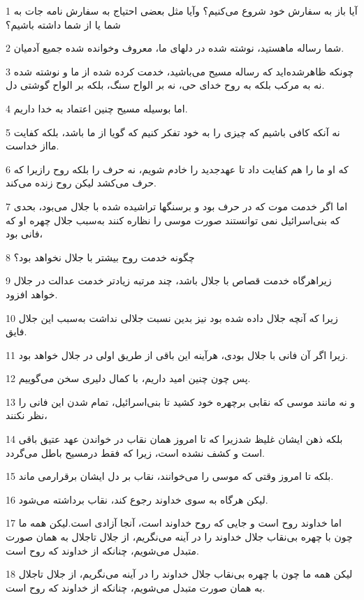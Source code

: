 \par 1 آیا باز به سفارش خود شروع می‌کنیم؟ وآیا مثل بعضی احتیاج به سفارش نامه جات به شما یا از شما داشته باشیم؟
\par 2 شما رساله ماهستید، نوشته شده در دلهای ما، معروف وخوانده شده جمیع آدمیان.
\par 3 چونکه ظاهرشده‌اید که رساله مسیح می‌باشید، خدمت کرده شده از ما و نوشته شده نه به مرکب بلکه به روح خدای حی، نه بر الواح سنگ، بلکه بر الواح گوشتی دل.
\par 4 اما بوسیله مسیح چنین اعتماد به خدا داریم.
\par 5 نه آنکه کافی باشیم که چیزی را به خود تفکر کنیم که گویا از ما باشد، بلکه کفایت مااز خداست.
\par 6 که او ما را هم کفایت داد تا عهدجدید را خادم شویم، نه حرف را بلکه روح رازیرا که حرف می‌کشد لیکن روح زنده می‌کند.
\par 7 اما اگر خدمت موت که در حرف بود و برسنگها تراشیده شده با جلال می‌بود، بحدی که بنی‌اسرائیل نمی توانستند صورت موسی را نظاره کنند به‌سبب جلال چهره او که فانی بود،
\par 8 چگونه خدمت روح بیشتر با جلال نخواهد بود؟
\par 9 زیراهرگاه خدمت قصاص با جلال باشد، چند مرتبه زیادتر خدمت عدالت در جلال خواهد افزود.
\par 10 زیرا که آنچه جلال داده شده بود نیز بدین نسبت جلالی نداشت به‌سبب این جلال فایق.
\par 11 زیرا اگر آن فانی با جلال بودی، هرآینه این باقی از طریق اولی در جلال خواهد بود.
\par 12 پس چون چنین امید داریم، با کمال دلیری سخن می‌گوییم.
\par 13 و نه مانند موسی که نقابی برچهره خود کشید تا بنی‌اسرائیل، تمام شدن این فانی را نظر نکنند،
\par 14 بلکه ذهن ایشان غلیظ شدزیرا که تا امروز همان نقاب در خواندن عهد عتیق باقی است و کشف نشده است، زیرا که فقط درمسیح باطل می‌گردد.
\par 15 بلکه تا امروز وقتی که موسی را می‌خوانند، نقاب بر دل ایشان برقرارمی ماند.
\par 16 لیکن هرگاه به سوی خداوند رجوع کند، نقاب برداشته می‌شود.
\par 17 اما خداوند روح است و جایی که روح خداوند است، آنجا آزادی است.لیکن همه ما چون با چهره بی‌نقاب جلال خداوند را در آینه می‌نگریم، از جلال تاجلال به همان صورت متبدل می‌شویم، چنانکه از خداوند که روح است.
\par 18 لیکن همه ما چون با چهره بی‌نقاب جلال خداوند را در آینه می‌نگریم، از جلال تاجلال به همان صورت متبدل می‌شویم، چنانکه از خداوند که روح است.

